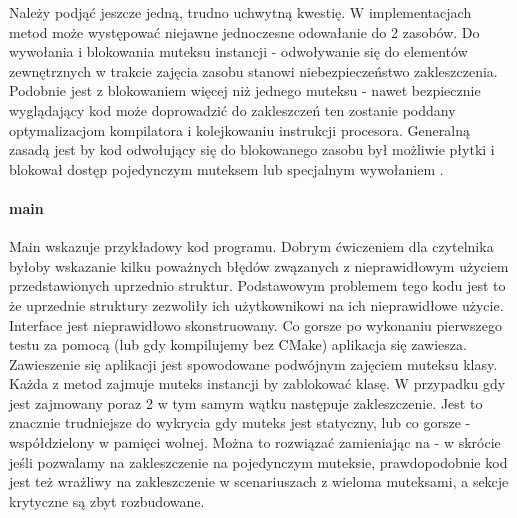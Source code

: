 Należy podjąć jeszcze jedną, trudno uchwytną kwestię. W implementacjach metod może występować niejawne jednoczesne odowałanie do 2 zasobów. Do wywołania  i blokowania muteksu instancji - odwoływanie się do elementów zewnętrznych w trakcie zajęcia zasobu stanowi niebezpieczeństwo zakleszczenia. Podobnie jest z blokowaniem więcej niż jednego muteksu - nawet bezpiecznie wyglądający kod może doprowadzić do zakleszczeń ten zostanie poddany optymalizacjom kompilatora i kolejkowaniu instrukcji procesora. Generalną zasadą jest by kod odwołujący się do blokowanego zasobu był możliwie płytki i blokował dostęp pojedynczym muteksem lub specjalnym wywołaniem .

\paragraph{main}
Main wskazuje przykładowy kod programu. Dobrym ćwiczeniem dla czytelnika byłoby wskazanie kilku poważnych błędów zwązanych z nieprawidłowym użyciem przedstawionych uprzednio struktur.
Podstawowym problemem tego kodu jest to że uprzednie struktury zezwoliły ich użytkownikowi na ich nieprawidłowe użycie. Interface jest nieprawidłowo skonstruowany. Co gorsze po wykonaniu pierwszego testu za pomocą  (lub  gdy kompilujemy bez CMake) aplikacja się zawiesza.
Zawieszenie się aplikacji jest spowodowane podwójnym zajęciem muteksu klasy. Każda z metod zajmuje muteks instancji by zablokować klasę. W przypadku gdy  jest zajmowany poraz 2 w tym samym wątku następuje zakleszczenie. Jest to znacznie trudniejsze do wykrycia gdy muteks jest statyczny, lub co gorsze - współdzielony w pamięci wolnej. Można to rozwiązać zamieniając  na   - w skrócie jeśli pozwalamy na zakleszczenie na pojedynczym muteksie, prawdopodobnie kod jest też wrażliwy na zakleszczenie w scenariuszach z wieloma muteksami, a sekcje krytyczne są zbyt rozbudowane.

